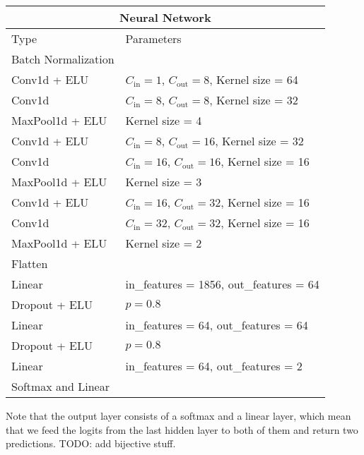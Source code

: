 \begin{tabular}{ |p{5cm}||l| }
  \hline
  \multicolumn{2}{|c|}{Neural Network} \\
  \hline
  Type & Parameters \\
  \hline
  Batch Normalization & \\
  Conv1d + ELU      & $C_\text{in}=1$, $C_\text{out}=8$, Kernel size = 64 \\
  
  Conv1d            & $C_\text{in}=8$, $C_\text{out}=8$, Kernel size = 32 \\
  MaxPool1d + ELU   & Kernel size = 4 \\
  
  Conv1d + ELU      & $C_\text{in}=8$, $C_\text{out}=16$, Kernel size = 32 \\
  
  Conv1d            & $C_\text{in}=16$, $C_\text{out}=16$, Kernel size = 16 \\
  MaxPool1d + ELU   & Kernel size = 3 \\
  
  Conv1d + ELU      & $C_\text{in}=16$, $C_\text{out}=32$, Kernel size = 16 \\
  
  Conv1d            & $C_\text{in}=32$, $C_\text{out}=32$, Kernel size = 16 \\
  MaxPool1d + ELU   & Kernel size = 2 \\

  Flatten           & \\

  Linear            & in\_features = 1856, out\_features = 64 \\
  Dropout + ELU     & $p=0.8$ \\

  Linear            & in\_features = 64, out\_features = 64 \\
  Dropout + ELU     & $p=0.8$ \\

  Linear            & in\_features = 64, out\_features = 2 \\

  Softmax and Linear           & \\
  \hline
\end{tabular}

Note that the output layer consists of a softmax and a linear layer, which mean
that we feed the logits from the last hidden layer to both of them and return
two predictions. TODO: add bijective stuff.

